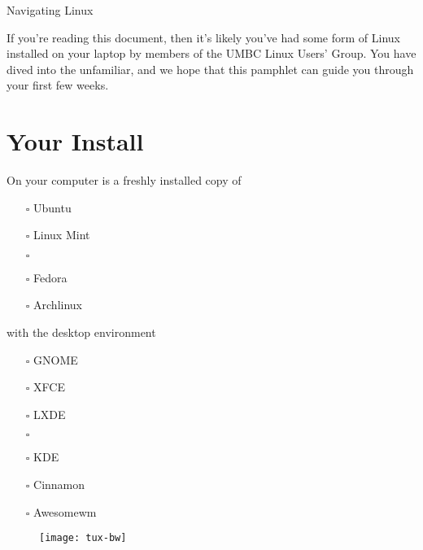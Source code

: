 \documentclass[11pt,notumble]{leaflet}
\begin{document}
\begin{center} \LARGE
    Navigating Linux
\end{center}

If you're reading this document, then it's likely you've had some form of Linux
installed on your laptop by members of the UMBC Linux Users' Group. You have
dived into the unfamiliar, and we hope that this pamphlet can guide you through
your first few weeks.

\section{Your Install}
\label{section:your-install}

On your computer is a freshly installed copy of

\begin{multicols}{2}
\begin{itemize}
    \item[$\square$] Ubuntu
    \item[$\square$] Linux Mint
    \item[$\square$] \hrulefill{}
    \item[$\square$] Fedora
    \item[$\square$] Archlinux
    \item[\phantom{}]
\end{itemize}
\end{multicols}

with the desktop environment
\begin{multicols}{2}
\begin{itemize}
    \item[$\square$] GNOME
    \item[$\square$] XFCE
    \item[$\square$] LXDE
    \item[$\square$] \hrulefill{}
    \item[$\square$] KDE
    \item[$\square$] Cinnamon
    \item[$\square$] Awesomewm
    \item[\phantom{}]
\end{itemize}
\end{multicols}

\vfill

\begin{figure}[hb]
    \centering
    \texttt{[image: tux-bw]}
\end{figure}
\end{document}
